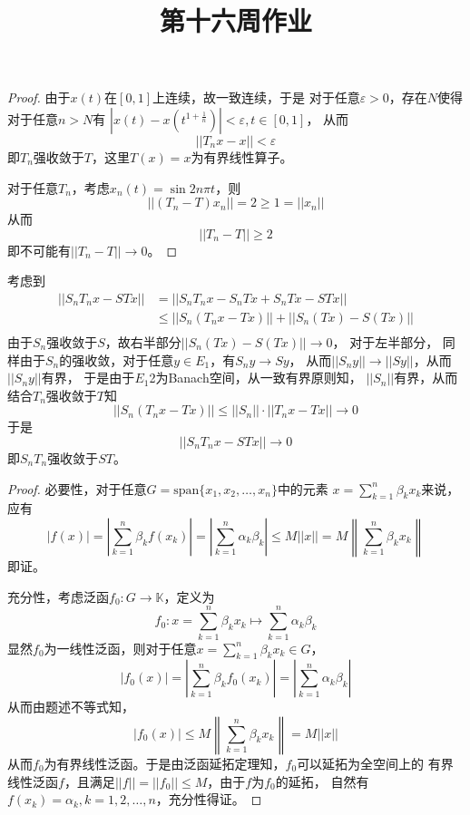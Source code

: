 \documentclass[cn]{homework}
\title{第十六周作业}
\begin{document}
    \maketitle

    \problem
    \begin{proof}
        由于$x(t)$在$[0,1]$上连续，故一致连续，于是
        对于任意$\varepsilon>0$，存在$N$使得对于任意$n>N$有
        $\left|x(t)-x(t^{1+\frac{1}{n}})\right|<\varepsilon,t\in[0,1]$，
        从而
        \[||T_n x-x||<\varepsilon\]
        即$T_n$强收敛于$T$，这里$T(x)=x$为有界线性算子。

        对于任意$T_n$，考虑$x_n(t)=\sin 2n\pi t$，则
        \[||(T_n-T)x_n||=2\geq 1=||x_n||\]
        从而
        \[||T_n-T||\geq 2\]
        即不可能有$||T_n-T||\to 0$。
    \end{proof}
    
    \problem
    考虑到
    \[\begin{aligned}
        ||S_nT_nx-STx||&=||S_nT_nx-S_nTx+S_nTx-STx||\\
        &\leq||S_n(T_nx-Tx)||+||S_n(Tx)-S(Tx)||\\
    \end{aligned}\]
    由于$S_n$强收敛于$S$，故右半部分$||S_n(Tx)-S(Tx)||\to 0$，
    对于左半部分，
    同样由于$S_n$的强收敛，对于任意$y\in E_1$，有$S_ny\to Sy$，
    从而$||S_ny||\to ||Sy||$，从而$||S_ny||$有界，
    于是由于$E_1$2为Banach空间，从一致有界原则知，
    $||S_n||$有界，从而结合$T_n$强收敛于$T$知
    \[||S_n(T_nx-Tx)||\leq ||S_n||\cdot||T_nx-Tx||\to 0\]
    于是
    \[||S_nT_nx-STx||\to 0\]
    即$S_nT_n$强收敛于$ST$。

    \problem
    \begin{proof}
        必要性，对于任意$G=\mathrm{span}\{x_1,x_2,\ldots,x_n\}$中的元素
        $x=\sum_{k=1}^n\beta_kx_k$来说，
        应有
        \[|f(x)|=\left|\sum_{k=1}^n\beta_kf(x_k)\right|
        =\left|\sum_{k=1}^n\alpha_k\beta_k\right|
        \leq M||x||=M\left\|\sum_{k=1}^n\beta_kx_k\right\|\]
        即证。

        充分性，考虑泛函$f_0:G\to\mathbb K$，定义为
        \[f_0:x=\sum_{k=1}^n\beta_kx_k\mapsto\sum_{k=1}^n\alpha_k\beta_k\]
        显然$f_0$为一线性泛函，则对于任意$x=\sum_{k=1}^n\beta_kx_k\in G$，
        \[|f_0(x)|=\left|\sum_{k=1}^n\beta_kf_0(x_k)\right|
        =\left|\sum_{k=1}^n\alpha_k\beta_k\right|\]
        从而由题述不等式知，
        \[|f_0(x)|\leq M\left\|\sum_{k=1}^n\beta_kx_k\right\|=M||x||\]
        从而$f_0$为有界线性泛函。于是由泛函延拓定理知，$f_0$可以延拓为全空间上的
        有界线性泛函$f$，且满足$||f||=||f_0||\leq M$，由于$f$为$f_0$的延拓，
        自然有$f(x_k)=\alpha_k,k=1,2,\ldots,n$，充分性得证。
    \end{proof}
\end{document}
